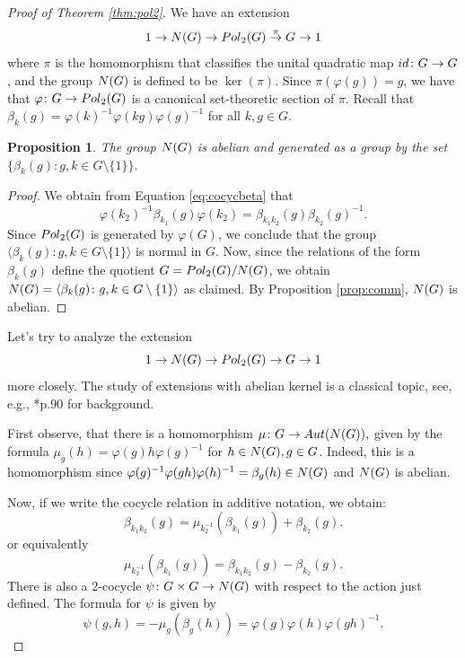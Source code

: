 \documentclass[a4paper,11pt]{amsproc}
\theoremstyle{plain}
\newtheorem{proposition}[theorem]{Proposition}
\theoremstyle{definition}
\begin{document}
\begin{proof}[Proof of Theorem \ref{thm:pol2}]
We have an extension
$$1 \to {\rm N}(G) \to {\rm Pol}_2(G) \stackrel{\pi}{\to} G \to 1$$
where $\pi$ is the homomorphism that classifies the unital quadratic map ${\rm id}\colon G \to G$, and the group ${\rm N}(G)$ is defined to be $\ker(\pi)$. Since $\pi(\varphi(g))=g$, we have that $\varphi \colon G \to {\rm Pol}_2(G)$ is a canonical set-theoretic section of $\pi$.  Recall that $\beta_k(g) = \varphi(k)^{-1}\varphi(kg) \varphi(g)^{-1}$ for all $k,g \in G$. 
\begin{proposition} 
The group ${\rm N}(G)$ is abelian and generated as a group by the set $\{\beta_k(g)\colon  g,k \in G \setminus \{1\}\}.$
\end{proposition}
\begin{proof}
We obtain from Equation \eqref{eq:cocycbeta} that
$$\varphi(k_2)^{-1} \beta_{k_1}(g) \varphi(k_2)= \beta_{k_1k_2}(g) \beta_{k_2}(g)^{-1}.$$
Since ${\rm Pol}_2(G)$ is generated by $\varphi(G)$, we conclude that the group $\langle \beta_k(g)\colon g,k \in G \setminus \{1\} \rangle$ is normal in $G$. 
Now, since the relations of the form $\beta_k(g)$ define the quotient $G={\rm Pol}_2(G)/{\rm N}(G)$, we obtain ${\rm N}(G)=\langle \beta_k(g)\colon g,k \in G \setminus \{1\} \rangle$ as claimed. By Proposition \ref{prop:comm}, ${\rm N}(G)$ is abelian.
\end{proof}

Let's try to analyze the extension 
$$1 \to {\rm N}(G) \to {\rm Pol}_2(G) \to G \to 1$$ more closely. The study of extensions with abelian kernel is a classical topic, see, e.g., \cite{MR1324339}*{p.90} for background.

First observe, that there is a homomorphism $\mu \colon G \to {\rm Aut}({\rm N}(G)),$ given by the formula
$\mu_g(h) = \varphi(g)h\varphi(g)^{-1}$ for $h \in {\rm N}(G), g \in G$. Indeed, this is a homomorphism since $\varphi(g)^{-1}\varphi(gh)\varphi(h)^{-1} =
\beta_g(h) \in {\rm N}(G)$ and ${\rm N}(G)$ is abelian.

Now, if we write the cocycle relation in additive notation, we obtain:
\begin{equation} \label{eq:additcoc}
\beta_{k_1k_2}(g) = \mu_{k_2^{-1}}(\beta_{k_1}(g)) + \beta_{k_2}(g).
\end{equation}
or equivalently
\begin{equation*}
\mu_{k_2^{-1}}(\beta_{k_1}(g)) = \beta_{k_1k_2}(g) - \beta_{k_2}(g).
\end{equation*}
There is also a 2-cocycle $\psi \colon G \times G \to {\rm N}(G)$ with respect to the action just defined. The formula for $\psi$ is given by
$$\psi(g,h) = - \mu_g(\beta_{g}(h)) = \varphi(g)\varphi(h)\varphi(gh)^{-1}.$$


\end{proof}
\end{document}
